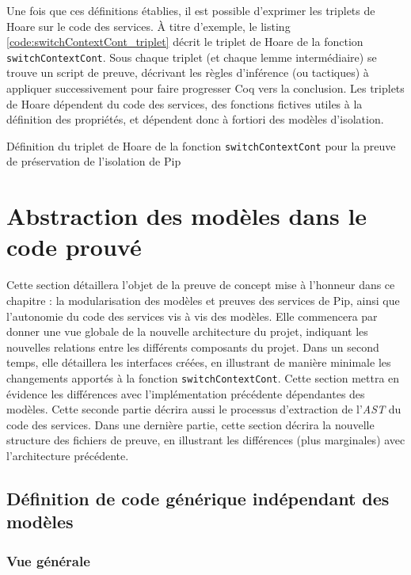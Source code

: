 			Une fois que ces définitions établies, il est possible d'exprimer les triplets de Hoare sur le code des services. À titre d'exemple, le listing \ref{code:switchContextCont_triplet} décrit le triplet de Hoare de la fonction \texttt{switchContextCont}. Sous chaque triplet (et chaque lemme intermédiaire) se trouve un script de preuve, décrivant les règles d'inférence (ou tactiques) à appliquer successivement pour faire progresser Coq vers la conclusion. Les triplets de Hoare dépendent du code des services, des fonctions fictives utiles à la définition des propriétés, et dépendent donc à fortiori des modèles d'isolation.
			\begin{listing}[!ht]
				\caption{Définition du triplet de Hoare de la fonction \texttt{switchContextCont} pour la preuve de préservation de l'isolation de Pip}
				\label{code:switchContextCont_triplet}
			\end{listing}

		
	\section{Abstraction des modèles dans le code prouvé}

	Cette section détaillera l'objet de la preuve de concept mise à l'honneur dans ce chapitre : la modularisation des modèles et preuves des services de Pip, ainsi que l'autonomie du code des services vis à vis des modèles. Elle commencera par donner une vue globale de la nouvelle architecture du projet, indiquant les nouvelles relations entre les différents composants du projet. Dans un second temps, elle détaillera les interfaces créées, en illustrant de manière minimale les changements apportés à la fonction \texttt{switchContextCont}. Cette section mettra en évidence les différences avec l'implémentation précédente dépendantes des modèles. Cette seconde partie décrira aussi le processus d'extraction de l'\emph{AST} du code des services. Dans une dernière partie, cette section décrira la nouvelle structure des fichiers de preuve, en illustrant les différences (plus marginales) avec l'architecture précédente.

		\subsection{Définition de code générique indépendant des modèles}

			\subsubsection{Vue générale}

